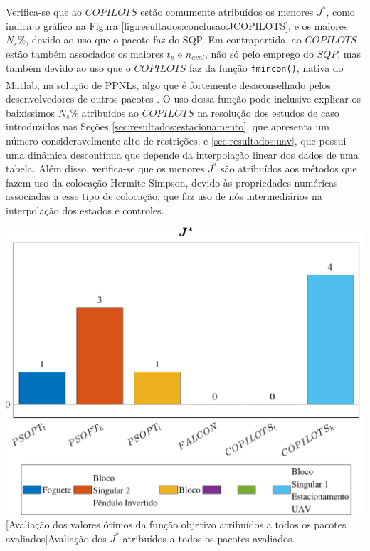 Verifica-se que ao $ COPILOTS $ estão comumente atribuídos os menores $ J^* $, como indica o gráfico na Figura \ref{fig:resultados:conclusao:JCOPILOTS}, e os maiores $ N_s\% $, devido ao uso que o pacote faz do SQP. Em contrapartida, ao $ COPILOTS $ estão também associados os maiores $ t_p $ e $ n_{aval} $, não só pelo emprego do $ SQP $, mas também devido ao uso que o $ COPILOTS $ faz da função \texttt{fmincon()}, nativa do Matlab\textsuperscript{\textregistered}, na solução de PPNLs, algo que é fortemente desaconselhado pelos desenvolvedores de outros pacotes \cite{falugi_iclocs2_2018}. O uso dessa função pode inclusive explicar os baixíssimos $ N_s\% $ atribuídos ao $ COPILOTS $ na resolução dos estudos de caso introduzidos nas Seções \ref{sec:resultados:estacionamento}, que apresenta um número consideravelmente alto de restrições, e \ref{sec:resultados:uav}, que possui uma dinâmica descontínua que depende da interpolação linear dos dados de uma tabela. Além disso, verifica-se que os menores $ J^* $ são atribuídos aos métodos que fazem uso da colocação Hermite-Simpson, devido às propriedades numéricas associadas a esse tipo de colocação, que faz uso de nós intermediários na interpolação dos estados e controles. 

\noindent	
\begin{minipage}{\textwidth}
	\vspace{\onelineskip}
	\centering
	\includegraphics[width=1\linewidth]{fig/resultados/ranking/all/J}
	[Avaliação dos valores ótimos da função objetivo atribuídos a todos os pacotes avaliados]{Avaliação dos $ J^* $ atribuídos a todos os pacotes avaliados.}
	\label{fig:resultados:conclusao:JCOPILOTS}
	\vspace{\onelineskip}
\end{minipage}

